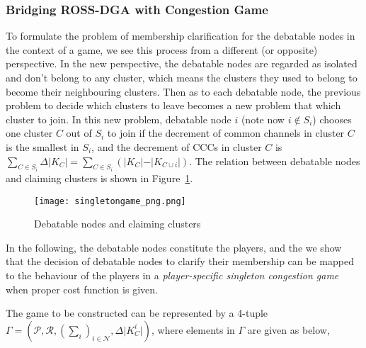 \documentclass[journal,comsoc]{IEEEtran}
\theoremstyle{mytheoremstyle}
\theoremstyle{mytheoremstyle}
\theoremstyle{mytheoremstyle}
\begin{document}
\subsubsection{Bridging ROSS-DGA with Congestion Game}
\label{clustering:phaseII:game}
To formulate the problem of membership clarification for the debatable nodes in the context of a game, we see this process from a different (or opposite) perspective. 
In the new perspective, the debatable nodes are regarded as isolated and don't belong to any cluster, which means the clusters they used to belong to become their neighbouring clusters. 
Then as to each debatable node, the previous problem to decide which clusters to leave becomes a new problem that which cluster to join.
In this new problem, debatable node $i$ (note now $i\notin S_i$) chooses one cluster $C$ out of $S_i$ to join if the decrement of common channels in cluster $C$ is the  %
smallest in $S_i$, and the decrement of CCCs in cluster $C$ is $\sum_{C\in S_i}\Delta\vert K_C \vert=\sum_{C\in S_i}({\vert K_{C} \vert-\vert K_{C\cup i} \vert})$. %
The relation between debatable nodes and claiming clusters is shown in Figure~\ref{debatable_nodes_claiming_cluster}.
\begin{figure}[ht!]
  \centering
  \texttt{[image: singletongame\_png.png]}
  \caption{Debatable nodes and claiming clusters}
  \label{debatable_nodes_claiming_cluster}
\end{figure}

In the following, the debatable nodes constitute the players, and the 
we show that the decision of debatable nodes to clarify their membership can be mapped to the behaviour of the players in a \textit{player-specific singleton congestion game} when proper cost function is given.

The game to be constructed can be represented by a 4-tuple $\Gamma=(\mathcal{P},\mathcal{R},(\sum_i)_{i \in \mathcal{N}},\Delta\vert K^i_C \vert)$, where elements in $\Gamma$ are given as below,
\end{document}
